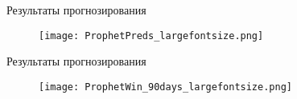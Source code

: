 \documentclass{beamer}
\begin{document}
\begin{frame}{Результаты прогнозирования}

\begin{figure}[h] 
    \centering
    \texttt{[image: ProphetPreds\_largefontsize.png]}
    \label{fig:ProphetPreds}
\end{figure}





\end{frame}

\begin{frame}{Результаты прогнозирования}



\begin{figure}
\texttt{[image: ProphetWin\_90days\_largefontsize.png]}
\end{figure}
\end{frame}



\end{document}
